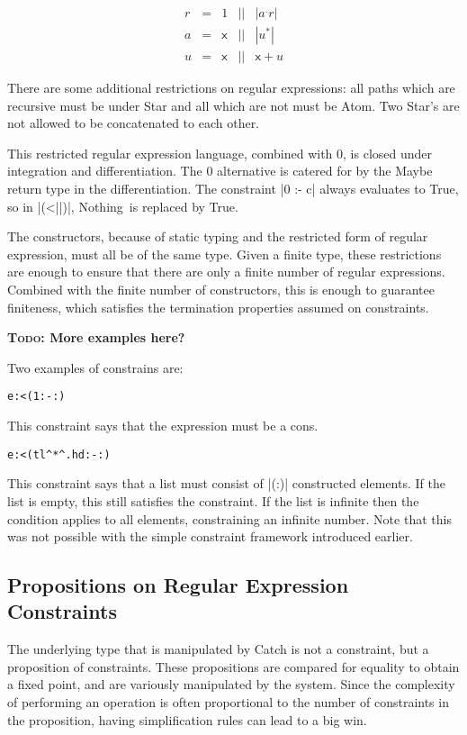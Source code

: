 \documentclass[preprint]{sigplanconf}
\newcommand{\C}[1]{\textsf{#1}}
\newcommand{\todo}[1]{\textbf{\textsc{Todo:} #1}}
\newenvironment{code}{\begin{alltt}\small}{\end{alltt}}
\begin{document}
\[\begin{array}{lllll}
r & = & 1     & || & |a^.r| \\
a & = & \C{x} & || & |u^*| \\
u & = & \C{x} & || & \C{x} + u
\end{array}\]

There are some additional restrictions on regular expressions: all paths which are recursive must be under \C{Star} and all which are not must be \C{Atom}. Two \C{Star}'s are not allowed to be concatenated to each other.

This restricted regular expression language, combined with 0, is closed under integration and differentiation. The 0 alternative is catered for by the \C{Maybe} return type in the differentiation. The constraint |0 :- c| always evaluates to True, so in |(<||)|, \C{Nothing}\ is replaced by True.

The constructors, because of static typing and the restricted form of regular expression, must all be of the same type.  Given a finite type, these restrictions are enough to ensure that there are only a finite number of regular expressions. Combined with the finite number of constructors, this is enough to guarantee finiteness, which satisfies the termination properties assumed on constraints.

\todo{More examples here?}

Two examples of constrains are:

\begin{code}
e :< (1 :- {:})
\end{code}

This constraint says that the expression must be a cons.

\begin{code}
e :< (tl ^* ^. hd :- {:})
\end{code}

This constraint says that a list must consist of |(:)| constructed elements. If the list is empty, this still satisfies the constraint. If the list is infinite then the condition applies to all elements, constraining an infinite number. Note that this was not possible with the simple constraint framework introduced earlier.

\subsection{Propositions on Regular Expression Constraints}

The underlying type that is manipulated by Catch is not a constraint, but a proposition of constraints. These propositions are compared for equality to obtain a fixed point, and are variously manipulated by the system. Since the complexity of performing an operation is often proportional to the number of constraints in the proposition, having simplification rules can lead to a big win.
\end{document}
